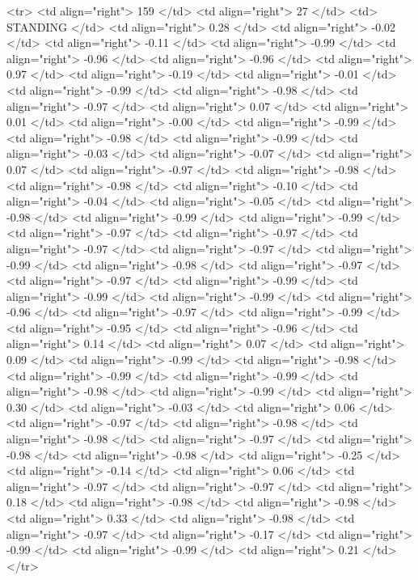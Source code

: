   <tr> <td align="right"> 159 </td> <td align="right">  27 </td> <td> STANDING </td> <td align="right"> 0.28 </td> <td align="right"> -0.02 </td> <td align="right"> -0.11 </td> <td align="right"> -0.99 </td> <td align="right"> -0.96 </td> <td align="right"> -0.96 </td> <td align="right"> 0.97 </td> <td align="right"> -0.19 </td> <td align="right"> -0.01 </td> <td align="right"> -0.99 </td> <td align="right"> -0.98 </td> <td align="right"> -0.97 </td> <td align="right"> 0.07 </td> <td align="right"> 0.01 </td> <td align="right"> -0.00 </td> <td align="right"> -0.99 </td> <td align="right"> -0.98 </td> <td align="right"> -0.99 </td> <td align="right"> -0.03 </td> <td align="right"> -0.07 </td> <td align="right"> 0.07 </td> <td align="right"> -0.97 </td> <td align="right"> -0.98 </td> <td align="right"> -0.98 </td> <td align="right"> -0.10 </td> <td align="right"> -0.04 </td> <td align="right"> -0.05 </td> <td align="right"> -0.98 </td> <td align="right"> -0.99 </td> <td align="right"> -0.99 </td> <td align="right"> -0.97 </td> <td align="right"> -0.97 </td> <td align="right"> -0.97 </td> <td align="right"> -0.97 </td> <td align="right"> -0.99 </td> <td align="right"> -0.98 </td> <td align="right"> -0.97 </td> <td align="right"> -0.97 </td> <td align="right"> -0.99 </td> <td align="right"> -0.99 </td> <td align="right"> -0.99 </td> <td align="right"> -0.96 </td> <td align="right"> -0.97 </td> <td align="right"> -0.99 </td> <td align="right"> -0.95 </td> <td align="right"> -0.96 </td> <td align="right"> 0.14 </td> <td align="right"> 0.07 </td> <td align="right"> 0.09 </td> <td align="right"> -0.99 </td> <td align="right"> -0.98 </td> <td align="right"> -0.99 </td> <td align="right"> -0.99 </td> <td align="right"> -0.98 </td> <td align="right"> -0.99 </td> <td align="right"> 0.30 </td> <td align="right"> -0.03 </td> <td align="right"> 0.06 </td> <td align="right"> -0.97 </td> <td align="right"> -0.98 </td> <td align="right"> -0.98 </td> <td align="right"> -0.97 </td> <td align="right"> -0.98 </td> <td align="right"> -0.98 </td> <td align="right"> -0.25 </td> <td align="right"> -0.14 </td> <td align="right"> 0.06 </td> <td align="right"> -0.97 </td> <td align="right"> -0.97 </td> <td align="right"> 0.18 </td> <td align="right"> -0.98 </td> <td align="right"> -0.98 </td> <td align="right"> 0.33 </td> <td align="right"> -0.98 </td> <td align="right"> -0.97 </td> <td align="right"> -0.17 </td> <td align="right"> -0.99 </td> <td align="right"> -0.99 </td> <td align="right"> 0.21 </td> </tr>
